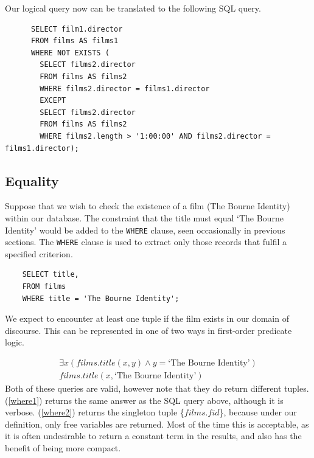 \documentclass[a4paper, 11pt]{article}
\begin{document}
      Our logical query now can be translated to the following SQL query.
      \begin{verbatim}
      SELECT film1.director
      FROM films AS films1
      WHERE NOT EXISTS (
        SELECT films2.director
        FROM films AS films2
        WHERE films2.director = films1.director
        EXCEPT
        SELECT films2.director
        FROM films AS films2
        WHERE films2.length > '1:00:00' AND films2.director = films1.director);
      \end{verbatim}

  \subsection{Equality}
    Suppose that we wish to check the existence of a film (The Bourne
    Identity) within our database. The constraint that the title must equal
    `The Bourne Identity' would be added to the \texttt{WHERE} clause, seen
    occasionally in previous sections. The \texttt{WHERE} clause is used to
    extract only those records that fulfil a specified
    criterion\cite{w3WHERE}.
    \begin{verbatim}
    SELECT title,
    FROM films
    WHERE title = 'The Bourne Identity';
    \end{verbatim}
    We expect to encounter at least one tuple if the film exists in our domain
    of discourse. This can be represented in one of two ways in first-order
    predicate logic.

    \begin{gather}
      \exists x(films.title(x, y) \land y = \text{`The Bourne
      Identity'})\label{where1}\\
      films.title(x, \text{`The Bourne Identity'})\label{where2}
    \end{gather}
    Both of these queries are valid, however note that they do return
    different tuples. (\ref{where1}) returns the same answer as the SQL query
    above, although it is verbose. (\ref{where2}) returns the singleton tuple
    \{$films.fid$\}, because under our definition, only free variables are
    returned. Most of the time this is acceptable, as it is often undesirable
    to return a constant term in the results, and also has the benefit of
    being more compact.
\end{document}
